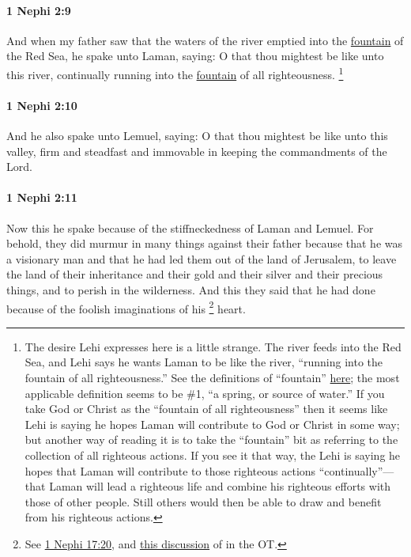 		\paragraph{1 Nephi 2:9} %
			\label{1NEPHI-2-9}

			And when my father saw that the waters of the river
			emptied into the \hyperref[FOUNTAIN]{fountain} of the Red Sea,
			he spake unto Laman, saying:
			O that thou mightest be like unto this river,
			continually running into the \hyperref[FOUNTAIN]{fountain} of all righteousness.%
				\footnote{%
					\label{1NEPHI-2-9-NOTE-fountain}%
					The desire Lehi expresses here is a little strange. The river feeds into the Red Sea, and Lehi says he wants Laman to be like the river, ``running into the fountain of all righteousness.'' See the definitions of ``fountain'' \hyperref[FOUNTAIN-1828]{here}; the most applicable definition seems to be \#1, ``a spring, or source of water.'' If you take God or Christ as the ``fountain of all righteousness'' then it seems like Lehi is saying he hopes Laman will contribute to God or Christ in some way; but another way of reading it is to take the ``fountain'' bit as referring to the collection of all righteous actions. If you see it that way, the Lehi is saying he hopes that Laman will contribute to those righteous actions ``continually''---that Laman will lead a righteous life and combine his righteous efforts with those of other people. Still others would then be able to draw and benefit from his righteous actions.
					}

		\paragraph{1 Nephi 2:10} %
			\label{1NEPHI-2-10}

			And he also spake unto Lemuel, saying:
			O that thou mightest be like unto this valley,
			firm and steadfast and immovable in keeping the commandments of the Lord.

		\paragraph{1 Nephi 2:11} %
			\label{1NEPHI-2-11}

			Now this he spake because of the stiffneckedness of Laman and Lemuel.
			For behold, they did murmur in many things against their father
			because that he was a visionary man
			and that he had led them out of the land of Jerusalem,
			to leave the land of their inheritance
			and their gold and their silver and their precious things,
			and to perish in the wilderness.
			And this they said that he had done
			because of the foolish imaginations of his
				\footnote{%
					\label{1NEPHI-2-11-foolish}%
					See \hyperref[1NEPHI-17-20]{1 Nephi 17:20}, and \hyperref[HEART-TDOT]{this discussion} of  in the OT.
					}%
			heart.

